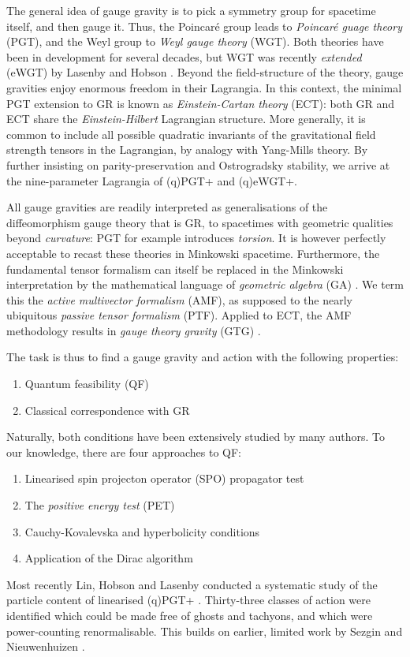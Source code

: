 \documentclass[twoside]{report}
\begin{document}
\begin{multicols}{2}
The general idea of gauge gravity is to pick a symmetry group for spacetime itself, and then gauge it. Thus, the Poincar\'e group leads to \textit{Poincar\'e guage theory} (PGT), and the Weyl group to \textit{Weyl gauge theory} (WGT). Both theories have been in development for several decades, but WGT was recently \textit{extended} (eWGT) by Lasenby and Hobson \cite{lasenby-hobson-2016}. Beyond the field-structure of the theory, gauge gravities enjoy enormous freedom in their Lagrangia. In this context, the minimal PGT extension to GR is known as \textit{Einstein-Cartan theory} (ECT): both GR and ECT share the \textit{Einstein-Hilbert} Lagrangian structure. More generally, it is common to include all possible quadratic invariants of the gravitational field strength tensors in the Lagrangian, by analogy with Yang-Mills theory. By further insisting on parity-preservation and Ostrogradsky stability, we arrive at the nine-parameter Lagrangia of (q)PGT+ and (q)eWGT+. 

All gauge gravities are readily interpreted as generalisations of the diffeomorphism gauge theory that is GR, to spacetimes with geometric qualities beyond \textit{curvature}: PGT for example introduces \textit{torsion}. It is however perfectly acceptable to recast these theories in Minkowski spacetime. Furthermore, the fundamental tensor formalism can itself be replaced in the Minkowski interpretation by the mathematical language of \textit{geometric algebra} (GA) \cite{doran-lasenby}. We term this the \textit{active multivector formalism} (AMF), as supposed to the nearly ubiquitous \textit{passive tensor formalism} (PTF). Applied to ECT, the AMF methodology results in \textit{gauge theory gravity} (GTG) \cite{1998RSPTA.356..487L}. 

The task is thus to find a gauge gravity and action with the following properties:
\begin{enumerate}[resume]
  \item Quantum feasibility (QF)
  \item Classical correspondence with GR
\end{enumerate}

Naturally, both conditions have been extensively studied by many authors. To our knowledge, there are four approaches to QF:
\begin{enumerate}[resume]
  \item\label{gr} Linearised spin projecton operator (SPO) propagator test
  \item\label{al} The \textit{positive energy test} (PET)
  \item\label{be} Cauchy-Kovalevska and hyperbolicity conditions
  \item\label{ga} Application of the Dirac algorithm 
\end{enumerate}
Most recently Lin, Hobson and Lasenby conducted a systematic study of the particle content of linearised (q)PGT+ \cite{2019PhRvD..99f4001L,Lin2}. Thirty-three classes of action were identified which could be made free of ghosts and tachyons, and which were power-counting renormalisable. This builds on earlier, limited work by Sezgin and Nieuwenhuizen \cite{1980PhRvD..21.3269S}.


\end{multicols}
\end{document}
